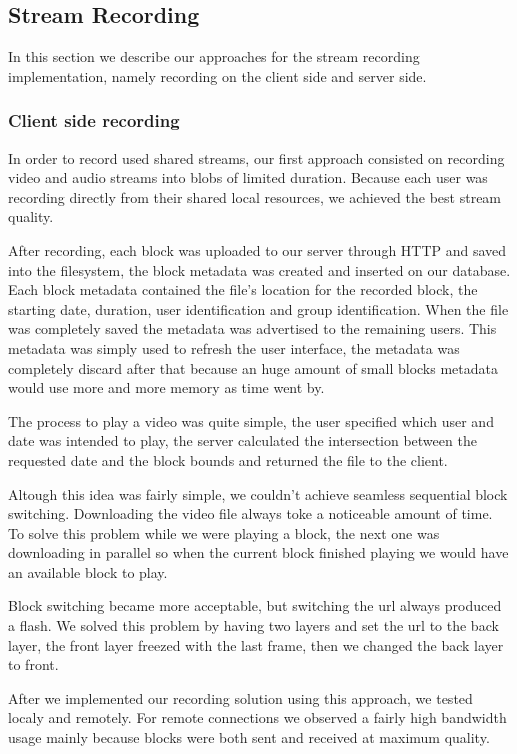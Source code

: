 \subsection{Stream Recording}
	In this section we describe our approaches for the stream recording implementation, namely recording on the client side and server side.

\subsubsection{Client side recording}
	In order to record used shared streams, our first approach consisted on recording video and audio streams into blobs of limited duration. Because each user was recording directly from their shared local resources, we achieved the best stream quality.

	After recording, each block was uploaded to our server through \ac{HTTP} and saved into the filesystem, the block metadata was created and inserted on our database. Each block metadata contained the file's location for the recorded block, the starting date, duration, user identification and group identification. When the file was completely saved the metadata was advertised to the remaining users. This metadata was simply used to refresh the user interface, the metadata was completely discard after that because an huge amount of small blocks metadata would use more and more memory as time went by. 

	The process to play a video was quite simple, the user specified which user and date was intended to play, the server calculated the intersection between the requested date and the block bounds and returned the file to the client.

	Altough this idea was fairly simple, we couldn't achieve seamless sequential block switching. Downloading the video file always toke a noticeable amount of time. To solve this problem while we were playing a block, the next one was downloading in parallel so when the current block finished playing we would have an available block to play. 

	Block switching became more acceptable, but switching the url always produced a flash. We solved this problem by having two layers and set the url to the back layer, the front layer freezed with the last frame, then we changed the back layer to front. 

	After we implemented our recording solution using this approach, we tested localy and remotely. For remote connections we observed a fairly high bandwidth usage mainly because blocks were both sent and received at maximum quality. 

